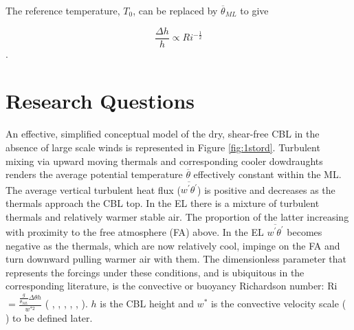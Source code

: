 The reference temperature, $T_{0}$, can be replaced by $\overline{\theta}_{ML}$ to give

\begin{equation}
\frac{\Delta h}{h} \propto Ri^{-\frac{1}{2}}
\end{equation}.



\section{Research Questions}
\label{sec:}

An effective, simplified conceptual model of the dry, shear-free \acs{CBL} in the absence of large scale winds is represented in Figure \ref{fig:1stord}.  Turbulent mixing via upward moving thermals and corresponding cooler dowdraughts renders the average potential temperature $\overline{\theta}$ effectively constant within the \acs{ML}.  The average vertical turbulent heat flux ($\overline{w^{'}\theta^{'}}$) is positive and decreases as the thermals approach the \acs{CBL} top.  In the \acs{EL} there is a mixture of turbulent thermals and relatively warmer stable air.  The proportion of the latter increasing with proximity to the free atmosphere (\acs{FA}) above.  In the \acs{EL} $\overline{w^{'}\theta^{'}}$ becomes negative as the thermals, which are now relatively cool, impinge on the \acs{FA} and turn downward pulling warmer air with them.  The dimensionless parameter that represents the forcings under these conditions, and is ubiquitous in the corresponding literature, is the convective or buoyancy Richardson number: \acs{Ri} $=\frac{\frac{g}{\overline{\theta}_{ML}}\Delta \theta h}{w^{*2}}$ ( \citeauthor{DearWill80} \citeyear{DearWill80}, \citeauthor{Stull-BLMetIntro} \citeyear{Stull-BLMetIntro}, \citeauthor{SullMoengStev} \citeyear{SullMoengStev}, \citeauthor{FedConzMir04} \citeyear{FedConzMir04}, \citeauthor{BrooksFowler2} \citeyear{BrooksFowler2}, \citeauthor{GarciaMellado} \citeyear{GarciaMellado}).  $h$ is the \acs{CBL} height and $w^{*}$ is the convective velocity scale (\citeauthor{Deardorff70} \citeyear{Deardorff70}) to be defined later.\\   


